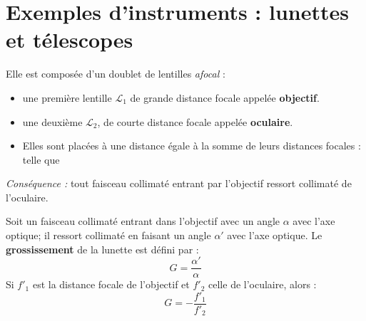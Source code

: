 \documentclass[11pt]{article}
\theoremstyle{cstyle}{\newtheorem{definition}{Définition}[section]}
\theoremstyle{cstyle}{\newtheorem{proposition}[definition]{Propriété}}
\theoremstyle{cstyle}{\newtheorem{theorem}[definition]{Théorème}}
\theoremstyle{mystyle}{\newtheorem{lemma}[definition]{Lemme}}
\theoremstyle{mystyle}{\newtheorem{corollary}[definition]{Corollaire}}
\theoremstyle{mystyle}{\newtheorem*{remark}{Remarque}}
\theoremstyle{mystyle}{\newtheorem*{remarks}{Remarques}}
\theoremstyle{mystyle}{\newtheorem*{example}{Exemple}}
\theoremstyle{mystyle}{\newtheorem*{examples}{Exemples}}
\theoremstyle{definition}{\newtheorem*{exercise}{Exercice}}
\theoremstyle{mystyle}{\newtheorem*{methode}{Méthode}}
\theoremstyle{cstyle}{\newtheorem*{cthm}{}}
\theoremstyle{warn}
\begin{document}
	\newpage
	
	\begin{minipage}[t]{0.46\textwidth}
		\section{Exemples d'instruments : lunettes et télescopes}
		
		\begin{definition}
			Elle est composée d'un doublet de lentilles \textit{afocal} :
			\begin{itemize}
				\renewcommand{\labelitemi}{$\circ$}
				\item une première lentille \(\mathcal{L}_1\) de grande distance focale appelée \textbf{objectif}.
				\item une deuxième \(\mathcal{L_2}\), de courte distance focale appelée \textbf{oculaire}.
				\item Elles sont placées à une distance égale à la somme de leurs distances focales : telle que 
			\end{itemize}
		
			\textit{Conséquence :} tout faisceau collimaté entrant par l'objectif ressort collimaté de l'oculaire.
		\end{definition}
	
		\begin{proposition}
			Soit un faisceau collimaté entrant dans l'objectif avec un angle \(\alpha\) avec l'axe optique; il ressort collimaté en faisant un angle \(\alpha'\) avec l'axe optique. Le \textbf{grossissement} de la lunette est défini par :
			\[
			\boxed{G = \frac{\alpha'}{\alpha}}
			\] 
			Si \(f'_1\) est la distance focale de l'objectif et \(f'_2\) celle de l'oculaire, alors :
			\[
			\boxed{G = -\frac{f'_1}{f'_2}}
			\] 
		\end{proposition}
		
	\end{minipage}
	\hfill
	\begin{minipage}[t]{0.46\textwidth}
	\end{minipage}
\end{document}
